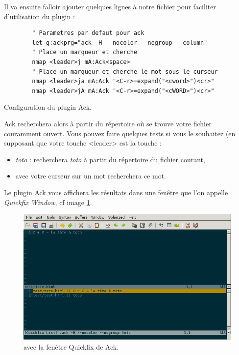 Il va ensuite falloir ajouter quelques lignes à notre fichier \vimrc pour faciliter d'utilisation du plugin :

\begin{listing}[H]

    \begin{verbatim}
        " Parametres par defaut pour ack
        let g:ackprg="ack -H --nocolor --nogroup --column"
        " Place un marqueur et cherche
        nmap <leader>j mA:Ack<space>
        " Place un marqueur et cherche le mot sous le curseur
        nmap <leader>ja mA:Ack "<C-r>=expand("<cword>")<cr>"
        nmap <leader>jA mA:Ack "<C-r>=expand("<cWORD>")<cr>"
    \end{verbatim}
    \caption{Configuration du plugin Ack.}
    \label{code:ack}
\end{listing}

Ack recherchera alors à partir du répertoire où se trouve votre fichier couramment ouvert. Vous pouvez faire quelques tests si vous le souhaitez (en supposant que votre touche <leader> est la touche \tcomma :

\begin{itemize}
    \item {} \emph{toto} : recherchera \emph{toto} à partir du répertoire du fichier courant,
    \item {} avec votre curseur sur un mot recherchera ce mot.
\end{itemize}

\bigskip

Le plugin Ack vous affichera les résultats dans une fenêtre que l'on appelle \emph{Quickfix Window}, cf image \ref{fig:vim-ack-quickfix}.

\begin{figure}%
  \includegraphics[width=\linewidth]{graphics/vim-ack-quickfix.png}
  \caption{\vim avec la fenêtre Quickfix de Ack.}
  \label{fig:vim-ack-quickfix}
\end{figure}



